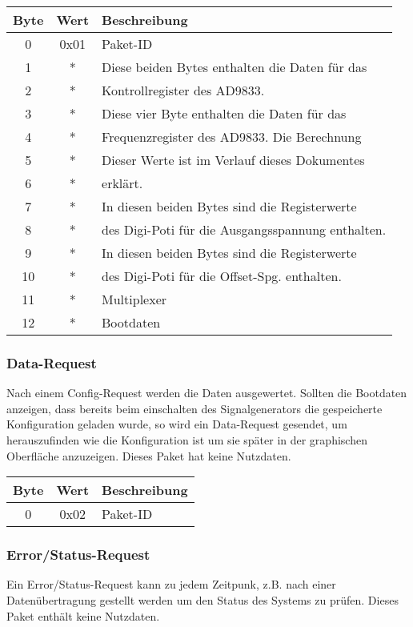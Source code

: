 \begin{flushleft}
\begin{tabular}{c||c|l}
Byte & Wert & Beschreibung \\
\hline
\hline
0 & 0x01 & Paket-ID \\
\hline
1 & * & Diese beiden Bytes enthalten die Daten für das \\
2 & * & Kontrollregister des AD9833.\\
\hline
3 & * & Diese vier Byte enthalten die Daten für das \\
4 & * & Frequenzregister des AD9833. Die Berechnung \\
5 & * & Dieser Werte ist im Verlauf dieses Dokumentes \\
6 & * & erklärt.\\
\hline
7 & * & In diesen beiden Bytes sind die Registerwerte \\
8 & * & des Digi-Poti für die Ausgangsspannung enthalten.\\
\hline
9 & * & In diesen beiden Bytes sind die Registerwerte \\
10 & * & des Digi-Poti für die Offset-Spg. enthalten.\\
\hline
11 & * & Multiplexer\\
\hline
12 & * & Bootdaten\\

\end{tabular}
\end{flushleft}

\subsubsection*{Data-Request}
Nach einem Config-Request werden die Daten ausgewertet. Sollten die Bootdaten anzeigen, dass bereits beim einschalten des Signalgenerators die gespeicherte Konfiguration geladen wurde, so wird ein Data-Request gesendet, um herauszufinden wie die Konfiguration ist um sie später in der graphischen Oberfläche anzuzeigen. Dieses Paket hat keine Nutzdaten.
\begin{flushleft}
\begin{tabular}{c||c|l}
Byte & Wert & Beschreibung \\
\hline
\hline
0 & 0x02 & Paket-ID \\

\end{tabular}
\end{flushleft}

\pagebreak
\subsubsection*{Error/Status-Request}
Ein Error/Status-Request kann zu jedem Zeitpunk, z.B. nach einer Datenübertragung gestellt werden um den Status des Systems zu prüfen. Dieses Paket enthält keine Nutzdaten.


